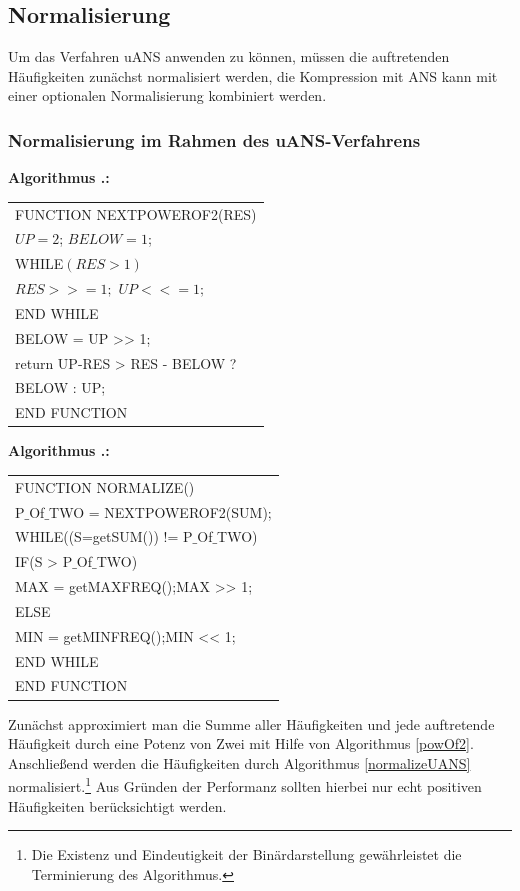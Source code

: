 \documentclass[a4paper,12pt]{article}
\newcounter{Algorithmus}
\newenvironment{Algorithmus}{
\medskip
        
        \setlength{\parindent}{0pt}
        \addtocounter{Algorithmus}{1}
        \textbf{\textsf{Algorithmus \thesubsection.\theAlgorithmus}:}}{
        \nopagebreak
        \vspace{-1.0ex}
        \bigskip
        
}
\begin{document}
\subsection{Normalisierung}
Um das Verfahren uANS anwenden zu können, müssen die auftretenden Häufigkeiten zunächst normalisiert werden, die Kompression mit ANS kann mit einer optionalen Normalisierung kombiniert werden.

\subsubsection{Normalisierung im Rahmen des uANS-Verfahrens}
\begin{minipage}[h]{.5\textwidth}
\begin{Algorithmus}\label{powOf2}
\\
\begin{tabular}{l}
FUNCTION NEXTPOWEROF2(RES) 
\\
$UP=2$; $BELOW=1$; 
\\
WHILE$(RES > 1)$ 
\\
$RES >>= 1;$ $UP <<= 1;$
\\
END WHILE
\\
BELOW = UP >> 1;  
\\
return UP-RES > RES - BELOW ? 
\\
BELOW : UP;
\\
END FUNCTION
\end{tabular} 
\end{Algorithmus}
\end{minipage}
\hfill
\begin{minipage}[h]{.5\textwidth}
\begin{Algorithmus}\label{normalizeUANS}
\\
\begin{tabular}{l}
FUNCTION NORMALIZE() 
\\
P$\_$Of$\_$TWO = NEXTPOWEROF2(SUM); 
\\
WHILE((S=getSUM()) != P$\_$Of$\_$TWO) 
\\
IF(S > P$\_$Of$\_$TWO)
\\
MAX = getMAXFREQ();MAX >> 1;
\\
ELSE
\\
MIN = getMINFREQ();MIN << 1;
\\
END WHILE
\\
END FUNCTION
\end{tabular} 
\end{Algorithmus}
\end{minipage}
Zunächst approximiert man die Summe aller Häufigkeiten und jede auftretende Häufigkeit durch eine Potenz von Zwei mit Hilfe von Algorithmus \ref{powOf2}. Anschließend werden die Häufigkeiten durch Algorithmus \ref{normalizeUANS} normalisiert.\footnote{Die Existenz und Eindeutigkeit der Binärdarstellung gewährleistet die Terminierung des Algorithmus.} Aus Gründen der Performanz sollten hierbei nur echt positiven Häufigkeiten berücksichtigt werden.
\end{document}

